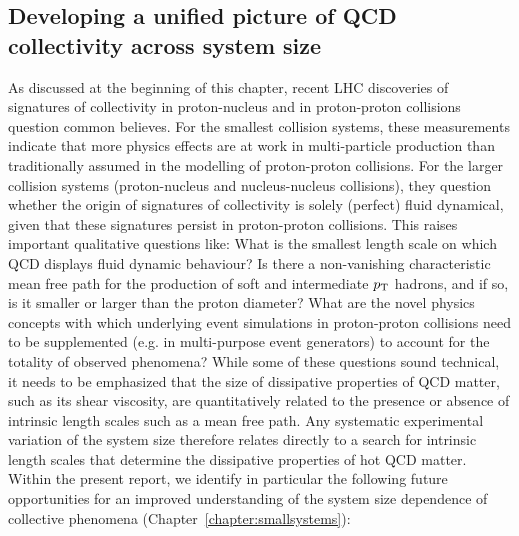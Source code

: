 \documentclass[../report.tex]{subfiles}
\begin{document}
\subsection{Developing a unified picture of QCD collectivity across system size}
As discussed at the beginning of this chapter, recent LHC discoveries of signatures of collectivity in proton-nucleus and in proton-proton collisions question common believes. For the smallest collision systems, these measurements indicate that more physics effects are at work in multi-particle production than traditionally assumed in the modelling of proton-proton collisions. For the larger collision systems (proton-nucleus and nucleus-nucleus collisions), they question whether the origin of signatures of collectivity is solely (perfect) fluid dynamical, given that these signatures persist in proton-proton collisions. This raises important qualitative questions like: What is the smallest length scale on which QCD displays fluid dynamic behaviour? Is there a non-vanishing characteristic mean free path for the production of soft and intermediate $p\sb{\scriptstyle\mathrm{T}}$ hadrons, and if so, is it smaller or larger than the proton diameter? What are the novel physics concepts with which underlying event simulations in proton-proton collisions need to be supplemented (e.g. in multi-purpose event generators) to account for the totality of observed phenomena?  While some of these questions sound technical, it needs to be emphasized that the size of dissipative properties of QCD matter, such as its shear viscosity, are quantitatively related to the presence or absence of intrinsic length scales such as a mean free path. Any systematic experimental variation of the system size therefore relates directly to a search for intrinsic length scales that determine the dissipative properties of hot QCD matter. Within the present report, we identify in particular the following future opportunities for an improved understanding of the system size dependence of collective phenomena (Chapter~\ref{chapter:smallsystems}):
\end{document}

